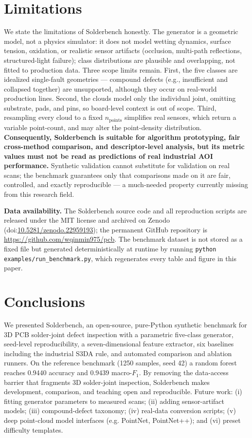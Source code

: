 \documentclass[3p]{elsarticle}
\begin{document}
\section{Limitations}
We state the limitations of Solderbench honestly.
The generator is a geometric model, not a physics simulator: it does not model wetting dynamics, surface tension, oxidation, or realistic sensor artifacts (occlusion, multi-path reflections, structured-light failure); class distributions are plausible and overlapping, not fitted to production data. Three scope limits remain. First, the five classes are idealized single-fault geometries --- compound defects (e.g., insufficient and collapsed together) are unsupported, although they occur on real-world production lines. Second, the clouds model only the individual joint, omitting substrate, pads, and pins, so board-level context is out of scope. Third, resampling every cloud to a fixed $n_{\mathrm{points}}$ simplifies real sensors, which return a variable point-count, and may alter the point-density distribution.
\textbf{Consequently, Solderbench is suitable for algorithm prototyping, fair cross-method comparison, and descriptor-level analysis, but its metric values must not be read as predictions of real industrial AOI performance.} Synthetic validation cannot substitute for validation on real scans; the benchmark guarantees only that comparisons made on it are fair, controlled, and exactly reproducible --- a much-needed property currently missing from this research field.

\begin{sloppypar}\noindent\textbf{Data availability.} The Solderbench source code and all reproduction scripts are released under the MIT license and archived on Zenodo (doi:\url{10.5281/zenodo.22959193}); the permanent GitHub repository is \url{https://github.com/wqinmin975/pcb}. The benchmark dataset is not stored as a fixed file but generated deterministically at runtime by running \texttt{python examples/run\_benchmark.py}, which regenerates every table and figure in this paper.\end{sloppypar}

\section{Conclusions}
We presented Solderbench, an open-source, pure-Python synthetic benchmark for 3D PCB solder-joint defect inspection with a parametric five-class generator, seed-level reproducibility, a seven-dimensional feature extractor, six baselines including the industrial S3DA rule, and automated comparison and ablation runners. On the reference benchmark (1250 samples, seed 42) a random forest reaches 0.9440 accuracy and 0.9439 macro-$F_1$. By removing the data-access barrier that fragments 3D solder-joint inspection, Solderbench makes development, comparison, and teaching open and reproducible. Future work: (i) fitting generator parameters to measured scans; (ii) adding sensor-artifact models; (iii) compound-defect taxonomy; (iv) real-data conversion scripts; (v) deep point-cloud model interfaces (e.g. PointNet, PointNet++); and (vi) preset difficulty templates.
\end{document}
